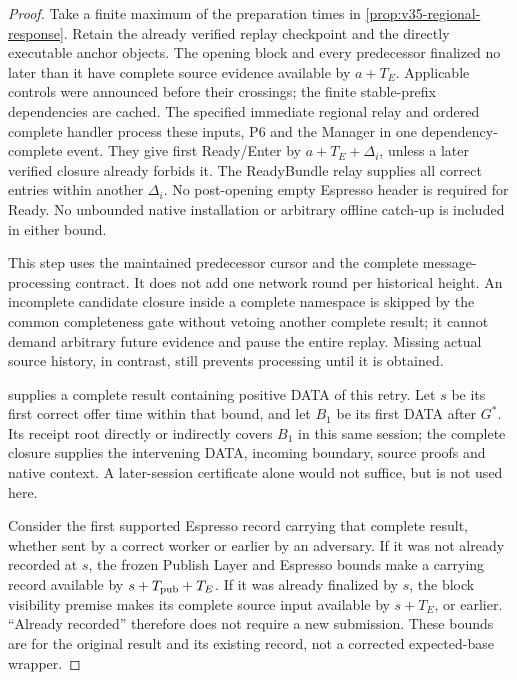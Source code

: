 \begin{proof}
Take a finite maximum of the preparation times in
\cref{prop:v35-regional-response}. Retain the already verified replay
checkpoint and the directly executable anchor objects. The opening
block and every predecessor finalized no later than it have complete
source evidence available by $a+T_E$. Applicable controls were announced
before their crossings; the finite stable-prefix dependencies are
cached. The specified immediate regional  relay and
ordered complete handler process these inputs, P6 and the Manager in
one dependency-complete event. They give first Ready/Enter by
$a+T_E+\Delta_i$, unless a later verified closure already forbids it.
The ReadyBundle relay supplies all correct entries within another
$\Delta_i$. No post-opening empty Espresso header is required for
Ready. No unbounded native installation or arbitrary offline catch-up
is included in either bound.

This step uses the maintained predecessor cursor and the complete
message-processing contract. It does not add one network round per
historical height. An incomplete candidate closure inside a complete namespace
is skipped by the common completeness gate without vetoing another
complete result; it cannot demand arbitrary future evidence and pause
the entire replay. Missing actual source
history, in contrast, still prevents processing until it is obtained.

 supplies a complete result containing
positive DATA of this retry. Let $s$ be its first correct offer time
within that bound, and let $B_1$ be its first DATA after $G^*$. Its
receipt root directly or indirectly covers $B_1$ in this same session;
the complete closure supplies the intervening DATA, incoming boundary,
source proofs and native context. A later-session certificate alone
would not suffice, but is not used here.

Consider the first supported Espresso record carrying that complete
result, whether sent by a correct worker or earlier by an adversary.
If it was not already recorded at $s$, the frozen Publish Layer and
Espresso bounds make a carrying record available by
$s+T_{\rm pub}+T_E$. If it was already finalized by $s$, the block
visibility premise makes its complete source input available by
$s+T_E$, or earlier. ``Already recorded'' therefore does not require a
new submission. These bounds are for the original result and its
existing record, not a corrected expected-base wrapper.


\end{proof}
